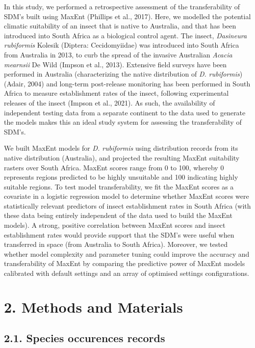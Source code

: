 \documentclass[12pt,]{article}
\begin{document}
In this study, we performed a retrospective assessment of the
transferability of SDM's built using MaxEnt (Phillips et al., 2017).
Here, we modelled the potential climatic suitability of an insect that
is native to Australia, and that has been introduced into South Africa
as a biological control agent. The insect, \emph{Dasineura rubiformis}
Kolesik (Diptera: Cecidomyiidae) was introduced into South Africa from
Australia in 2013, to curb the spread of the invasive Australian
\emph{Acacia mearnsii} De Wild (Impson et al., 2013). Extensive field
surveys have been performed in Australia (characterizing the native
distribution of \emph{D. rubiformis}) (Adair, 2004) and long-term
post-release monitoring has been performed in South Africa to measure
establishment rates of the insect, following experimental releases of
the insect (Impson et al., 2021). As such, the availability of
independent testing data from a separate continent to the data used to
generate the models makes this an ideal study system for assessing the
transferability of SDM's.

We built MaxEnt models for \emph{D. rubiformis} using distribution
records from its native distribution (Australia), and projected the
resulting MaxEnt suitability rasters over South Africa. MaxEnt scores
range from 0 to 100, whereby 0 represents regions predicted to be highly
unsuitable and 100 indicating highly suitable regions. To test model
transferability, we fit the MaxEnt scores as a covariate in a logistic
regression model to determine whether MaxEnt scores were statistically
relevant predictors of insect establishment rates in South Africa (with
these data being entirely independent of the data used to build the
MaxEnt models). A strong, positive correlation between MaxEnt scores and
insect establishment rates would provide support that the SDM's were
useful when transferred in space (from Australia to South Africa).
Moreover, we tested whether model complexity and parameter tuning could
improve the accuracy and transferability of MaxEnt by comparing the
predictive power of MaxEnt models calibrated with default settings and
an array of optimised settings configurations.

\hypertarget{methods-and-materials}{%
\section{2. Methods and Materials}\label{methods-and-materials}}

\hypertarget{species-occurences-records}{%
\subsection{2.1. Species occurences
records}\label{species-occurences-records}}
\end{document}
